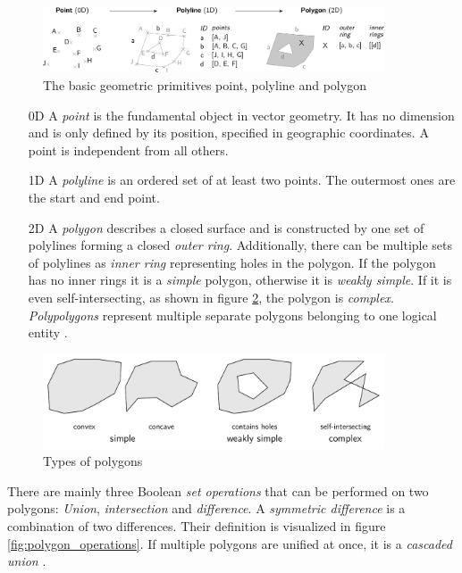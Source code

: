 \begin{figure}[H]
  \vspace{1em}
  \centering
  \includegraphics[width=0.9\textwidth]{graphics/basics/hgis/geometric_primitives}
  \caption{The basic geometric primitives point, polyline and polygon}
  \label{fig:geometric_primitives}
\end{figure}

\begin{enumerate}
  \item[0D] A \emph{point} is the fundamental object in vector geometry. It has no dimension and is only defined by its position, specified in geographic coordinates. A point is independent from all others.
  \item[1D] A \emph{polyline} is an ordered set of at least two points. The outermost ones are the start and end point.
  \item[2D] A \emph{polygon} describes a closed surface and is constructed by one set of polylines forming a closed \emph{outer ring}. Additionally, there can be multiple sets of polylines as \emph{inner ring} representing holes in the polygon. If the polygon has no inner rings it is a \emph{simple} polygon, otherwise it is \emph{weakly simple}. If it is even self-intersecting, as shown in figure \ref{fig:polygon_properties}, the polygon is \emph{complex}. \emph{Polypolygons} represent multiple separate polygons belonging to one logical entity \cite{polygons}.
\end{enumerate}

\begin{figure}[H]
  \centering
  \includegraphics[width=0.9\textwidth]{graphics/basics/hgis/polygon_properties}
  \caption{Types of polygons}
  \label{fig:polygon_properties}
\end{figure}

There are mainly three Boolean \emph{set operations} that can be performed on two polygons: \emph{Union}, \emph{intersection} and \emph{difference}. A \emph{symmetric difference} is a combination of two differences. Their definition is visualized in figure \ref{fig:polygon_operations}.
If multiple polygons are unified at once, it is a \emph{cascaded union}
\cite{bolstad2008gis}.

